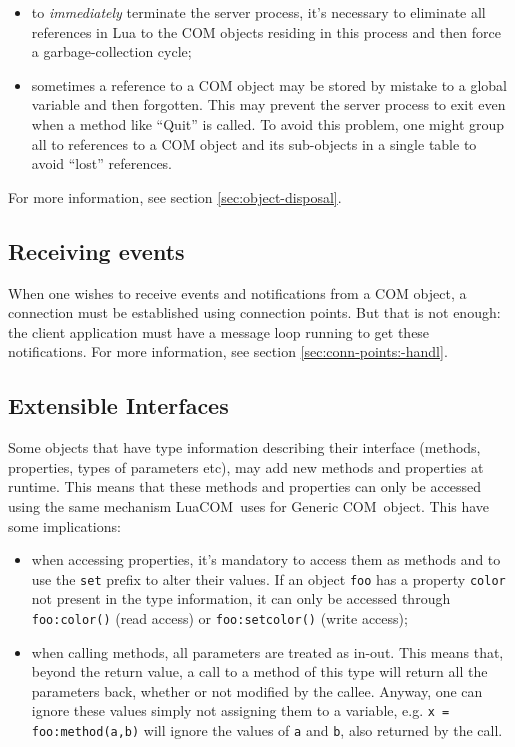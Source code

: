 \documentclass[11pt,a4paper,english]{report}
\newcommand{\ident}[1]{\mbox{\texttt{#1}}}
\newcommand{\techname}[1]{\mbox{#1}}
\newcommand{\com}{\techname{COM}}
\newcommand{\luacom}{\techname{LuaCOM}}
\begin{document}
\begin{itemize}
\item to \emph{immediately} terminate the server process, it's
necessary to eliminate all references in Lua to the COM objects
residing in this process and then force a garbage-collection cycle;
\item sometimes a reference to a COM object may be stored by mistake
to a global variable and then forgotten. This may prevent the
server process to exit even when a method like ``Quit'' is called. To
avoid this problem, one might group all to references to a COM object
and its sub-objects in a single table to avoid ``lost'' references.
\end{itemize}

For more information, see section \ref{sec:object-disposal}.


\subsection{Receiving events}
When one wishes to receive events and notifications from a COM object,
a connection must be established using connection points. But that is
not enough: the client application must have a message loop running to
get these notifications. For more information, see section
\ref{sec:conn-points:-handl}.


\subsection{Extensible Interfaces}

Some objects that have type information describing their interface
(methods, properties, types of parameters etc), may add new methods
and properties at runtime. This means that these methods and
properties can only be accessed using the same mechanism \luacom\ uses
for Generic \com\ object. This have some implications:

\begin{itemize}
\item when accessing properties, it's mandatory to access them as
methods and to use the \ident{set} prefix to alter their values. If an
object \ident{foo} has a property \ident{color} not present in the
type information, it can only be accessed through \ident{foo:color()}
(read access) or \ident{foo:setcolor()} (write access);

\item when calling methods, all parameters are treated as in-out. This
means that, beyond the return value, a call to a method of this type
will return all the parameters back, whether or not modified by the
callee. Anyway, one can ignore these values simply not assigning them
to a variable, e.g. \ident{x = foo:method(a,b)} will ignore the values
of \ident{a} and \ident{b}, also returned by the call.

\end{itemize}
\end{document}
